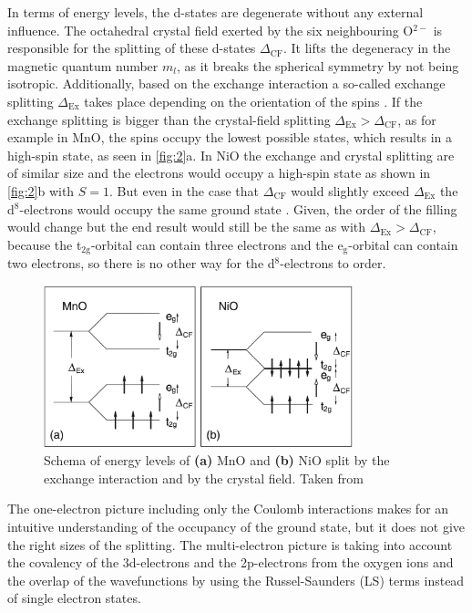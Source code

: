 In terms of energy levels, the d-states are degenerate without any external influence.
The octahedral crystal field exerted by the six neighbouring O$^{2-}$ is responsible for the splitting of these d-states $\Delta_{\text{CF}}$.
It lifts the degeneracy in the magnetic quantum number $m_l$, as it breaks the spherical symmetry by not being isotropic.
Additionally, based on the exchange interaction a so-called exchange splitting $\Delta_{\text{Ex}}$ takes place depending on the orientation of the spins .
If the exchange splitting is bigger than the crystal-field splitting $\Delta_{\text{Ex}} > \Delta_{\text{CF}}$, as for example in MnO, the spins occupy the lowest possible states, which results in a high-spin state, as seen in \autoref{fig:2}a.
In NiO the exchange and crystal splitting are of similar size and the electrons would occupy a high-spin state as shown in \autoref{fig:2}b with $S=1$. But even in the case that $\Delta_{\text{CF}}$ would slightly exceed $\Delta_{\text{Ex}}$ the d$^8$-electrons would occupy the same ground state .
Given, the order of the filling would change but the end result would still be the same as with $\Delta_{\text{Ex}} > \Delta_{\text{CF}}$, because the t$_{\text{2g}}$-orbital can contain three electrons and the e$_{\text{g}}$-orbital can contain two electrons, so there is no other way for the d$^8$-electrons to order.
\begin{figure}[ht]
    \centering
    \includegraphics[width=0.8\textwidth]{pictures/2.png}
    \caption{Schema of energy levels of \textbf{(a)} MnO and \textbf{(b)} NiO split by the exchange interaction and by the crystal field. Taken from }
    \label{fig:2}
\end{figure}
\FloatBarrier
The one-electron picture including only the Coulomb interactions makes for an intuitive understanding of the occupancy of the ground state, but it does not give the right sizes of the splitting.
The multi-electron picture is taking into account the covalency of the 3d-electrons and the 2p-electrons from the oxygen ions and the overlap of the wavefunctions by using the Russel-Saunders (LS) terms instead of single electron states.
